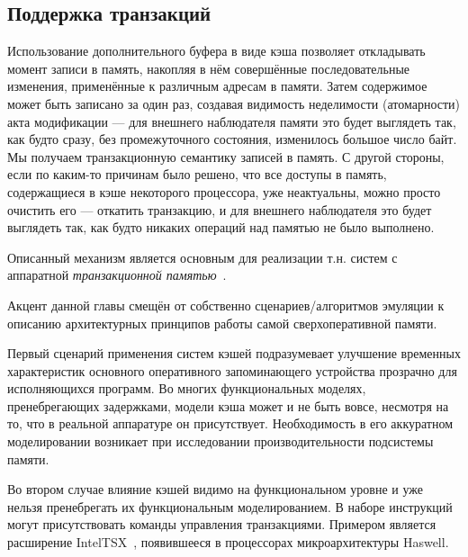 \subsection{Поддержка транзакций}

Использование дополнительного буфера в виде кэша позволяет откладывать момент записи в память, накопляя в нём совершённые последовательные изменения, применённые к различным адресам в памяти. Затем содержимое может быть записано за один раз, создавая видимость неделимости (атомарности) акта модификации ---  для внешнего наблюдателя памяти это будет выглядеть так, как будто сразу, без промежуточного состояния, изменилось большое число байт. Мы получаем транзакционную семантику записей в память. С другой стороны, если по каким-то причинам было решено, что все доступы в память, содержащиеся в кэше некоторого процессора, уже неактуальны, можно просто очистить его --- откатить транзакцию, и для внешнего наблюдателя это будет выглядеть так, как будто никаких операций над памятью не было выполнено.

Описанный  механизм является основным для реализации т.н. систем с аппаратной \textit{транзакционной памятью}~\cite{rajwar2002}.

\begin{digression}

Акцент данной главы смещён от собственно сценариев/алгоритмов эмуляции к описанию архитектурных принципов работы самой сверхоперативной памяти. 

Первый сценарий применения систем кэшей подразумевает улучшение временных характеристик основного оперативного запоминающего устройства прозрачно для исполняющихся программ. Во многих функциональных моделях, пренебрегающих задержками, модели кэша может и не быть вовсе, несмотря на то, что в реальной аппаратуре он присутствует. Необходимость в его аккуратном моделировании возникает при  исследовании производительности подсистемы памяти.

Во втором случае влияние кэшей видимо на функциональном уровне и уже нельзя пренебрегать их функциональным моделированием. В наборе инструкций могут присутствовать команды управления транзакциями. Примером является расширение Intel\textregistered TSX~\cite[глава 8]{intel-x-reference}, появившееся в процессорах микроархитектуры Haswell.

\end{digression}


